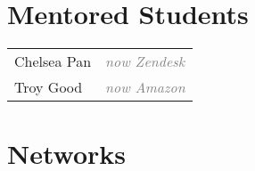 \documentclass[10pt]{cooperCV2}
\begin{document}





%	






\section{Mentored Students}
\begin{longtable}{@{} l  l @{}}
 
Chelsea Pan &  \textcolor{gray}{\textit{ now Zendesk}}  \\
 
Troy Good &  \textcolor{gray}{\textit{ now Amazon}}  \\

\end{longtable}






%	






\section{Networks}
\end{document}
